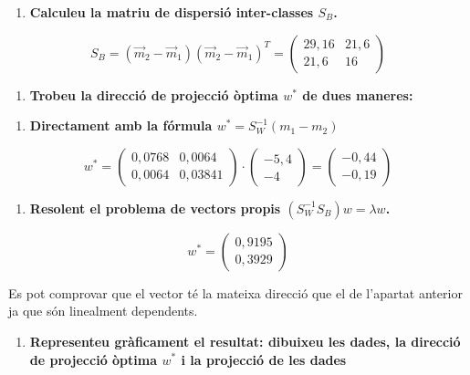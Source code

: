 \documentclass[a4paper]{article}
\begin{document}
\begin{enumerate}[resume=main]
	\item \textbf{Calculeu la matriu de dispersió inter-classes $S_B$.}
\end{enumerate}
$$
S_B = (\vec{m}_2 - \vec{m}_1)(\vec{m}_2 - \vec{m}_1)^T = 
\begin{pmatrix}
29,16 & 21,6 \\
21,6 & 16
\end{pmatrix}
$$

\begin{enumerate}[resume=main]
	\item \textbf{Trobeu la direcció de projecció òptima $w^*$ de dues maneres:}
\end{enumerate}

\begin{enumerate}[resume=second,label=(\alph*),itemindent=1em]
	\item \textbf{Directament amb la fórmula $w^* = S_W^{-1} (m_1 - m_2)$}
\end{enumerate}

$$
w^* = 
\begin{pmatrix}
0,0768 & 0,0064 \\
0,0064 & 0,03841
\end{pmatrix} ·
\begin{pmatrix}
-5,4 \\ -4
\end{pmatrix} =
\begin{pmatrix}
-0,44 \\
-0,19
\end{pmatrix}
$$

\begin{enumerate}[resume=second,label=(\alph*),itemindent=1em]
	\item \textbf{Resolent el problema de vectors propis $(S_W^{-1}S_B)w = \lambda w$.}
\end{enumerate}

$$
w^* = 
\begin{pmatrix}
0,9195 \\
 0,3929
\end{pmatrix}
$$

Es pot comprovar que el vector té la mateixa direcció que el  de l'apartat anterior ja que són linealment dependents.

\begin{enumerate}[resume=main]
	\item \textbf{Representeu gràficament el resultat: dibuixeu les dades, la direcció de projecció òptima $w^*$ i la projecció de les dades}
\end{enumerate}
\end{document}
